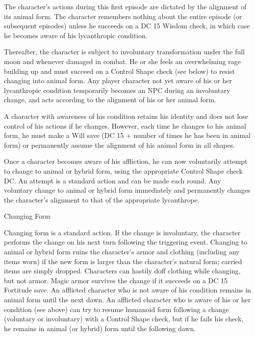 \documentclass{article}
\begin{document}
The character's actions during this first episode are dictated by the alignment 
of its animal form. The character remembers nothing about the entire episode (or 
subsequent episodes) unless he succeeds on a DC 15 Wisdom check, in which case 
he becomes aware of his lycanthropic condition.

Thereafter, the character is subject to involuntary transformation under the full 
moon and whenever damaged in combat. He or she feels an overwhelming rage building 
up and must succeed on a Control Shape check (see below) to resist changing into 
animal form. Any player character not yet aware of his or her lycanthropic condition 
temporarily becomes an NPC during an involuntary change, and acts according to 
the alignment of his or her animal form.

A character with awareness of his condition retains his identity and does not lose 
control of his actions if he changes. However, each time he changes to his animal 
form, he must make a Will save (DC 15 + number of times he has been in animal form) 
or permanently assume the alignment of his animal form in all shapes. 

Once a character becomes aware of his affliction, he can now voluntarily attempt 
to change to animal or hybrid form, using the appropriate Control Shape check DC. 
An attempt is a standard action and can be made each round. Any voluntary change 
to animal or hybrid form immediately and permanently changes the character's alignment 
to that of the appropriate lycanthrope.

\vspace{12pt}
Changing Form

Changing form is a standard action. If the change is involuntary, the character 
performs the change on his next turn following the triggering event. Changing to 
animal or hybrid form ruins the character's armor and clothing (including any items 
worn) if the new form is larger than the character's natural form; carried items 
are simply dropped. Characters can hastily doff clothing while changing, but not 
armor. Magic armor survives the change if it succeeds on a DC 15 Fortitude save. 
An afflicted character who is not aware of his condition remains in animal form 
until the next dawn. An afflicted character who is aware of his or her condition 
(see above) can try to resume humanoid form following a change (voluntary or involuntary) 
with a Control Shape check, but if he fails his check, he remains in animal (or 
hybrid) form until the following dawn.
\end{document}
